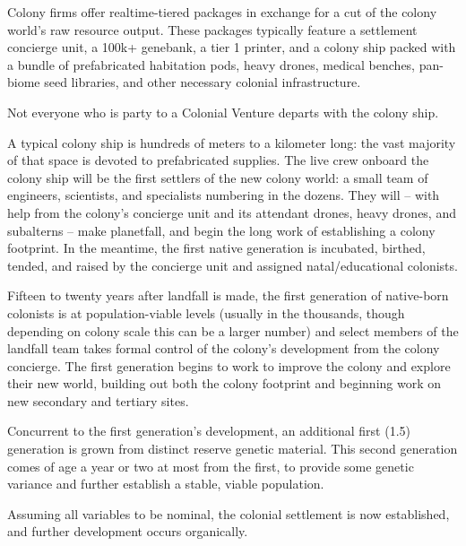 Colony firms offer realtime-tiered packages in exchange for a cut of the colony world’s raw
resource output. These packages typically feature a settlement concierge unit, a 100k+
genebank, a tier 1 printer, and a colony ship packed with a bundle of prefabricated habitation
pods, heavy drones, medical benches, pan-biome seed libraries, and other necessary colonial
infrastructure.

Not everyone who is party to a Colonial Venture departs with the colony ship.

A typical colony ship is hundreds of meters to a kilometer long: the vast majority of that space is
devoted to prefabricated supplies. The live crew onboard the colony ship will be the first settlers
of the new colony world: a small team of engineers, scientists, and specialists numbering in the
dozens. They will -- with help from the colony’s concierge unit and its attendant drones, heavy
drones, and subalterns -- make planetfall, and begin the long work of establishing a colony
footprint. In the meantime, the first native generation is incubated, birthed, tended, and raised by
the concierge unit and assigned natal/educational colonists.

Fifteen to twenty years after landfall is made, the first generation of native-born colonists is at
population-viable levels (usually in the thousands, though depending on colony scale this can be
a larger number) and select members of the landfall team takes formal control of the colony’s
development from the colony concierge. The first generation begins to work to improve the
colony and explore their new world, building out both the colony footprint and beginning work on
new secondary and tertiary sites.

Concurrent to the first generation’s development, an additional first (1.5) generation is grown
from distinct reserve genetic material. This second generation comes of age a year or two at
most from the first, to provide some genetic variance and further establish a stable, viable
population.

Assuming all variables to be nominal, the colonial settlement is now established, and further
development occurs organically.